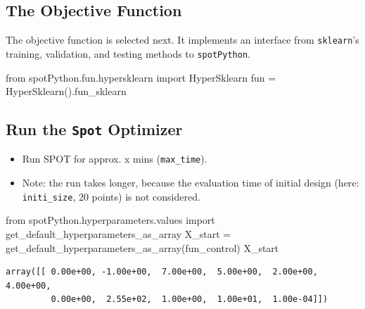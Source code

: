 \documentclass[
  letterpaper,
  DIV=11,
  numbers=noendperiod]{scrreprt}
\newenvironment{Shaded}{\begin{snugshade}}{\end{snugshade}}
\newcommand{\ImportTok}[1]{\textcolor[rgb]{0.00,0.46,0.62}{#1}}
\newcommand{\NormalTok}[1]{\textcolor[rgb]{0.00,0.23,0.31}{#1}}
\newcommand{\OperatorTok}[1]{\textcolor[rgb]{0.37,0.37,0.37}{#1}}
\providecommand{\tightlist}{%
  \setlength{\itemsep}{0pt}\setlength{\parskip}{0pt}}\usepackage{longtable,booktabs,array}
\begin{document}
\hypertarget{sec-the-objective-function-17}{%
\subsection{The Objective
Function}\label{sec-the-objective-function-17}}

The objective function is selected next. It implements an interface from
\texttt{sklearn}'s training, validation, and testing methods to
\texttt{spotPython}.

\begin{Shaded}
\begin{Highlighting}[]
\ImportTok{from}\NormalTok{ spotPython.fun.hypersklearn }\ImportTok{import}\NormalTok{ HyperSklearn}
\NormalTok{fun }\OperatorTok{=}\NormalTok{ HyperSklearn().fun\_sklearn}
\end{Highlighting}
\end{Shaded}

\hypertarget{run-the-spot-optimizer-2}{%
\subsection{\texorpdfstring{Run the \texttt{Spot}
Optimizer}{Run the Spot Optimizer}}\label{run-the-spot-optimizer-2}}

\begin{itemize}
\tightlist
\item
  Run SPOT for approx. x mins (\texttt{max\_time}).
\item
  Note: the run takes longer, because the evaluation time of initial
  design (here: \texttt{initi\_size}, 20 points) is not considered.
\end{itemize}

\begin{Shaded}
\begin{Highlighting}[]
\ImportTok{from}\NormalTok{ spotPython.hyperparameters.values }\ImportTok{import}\NormalTok{ get\_default\_hyperparameters\_as\_array}
\NormalTok{X\_start }\OperatorTok{=}\NormalTok{ get\_default\_hyperparameters\_as\_array(fun\_control)}
\NormalTok{X\_start}
\end{Highlighting}
\end{Shaded}

\begin{verbatim}
array([[ 0.00e+00, -1.00e+00,  7.00e+00,  5.00e+00,  2.00e+00,  4.00e+00,
         0.00e+00,  2.55e+02,  1.00e+00,  1.00e+01,  1.00e-04]])
\end{verbatim}
\end{document}
